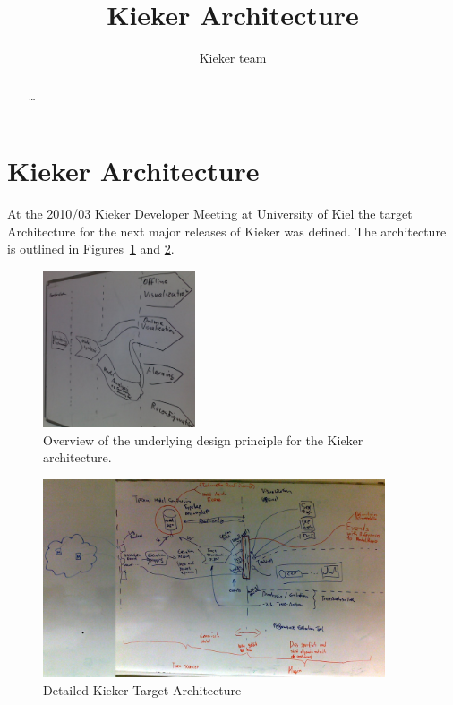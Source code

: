 \documentclass[12pt,journal,a4paper,twocolumn,final,oneside]{IEEEtran}%
\begin{document}
%

\setcounter{page}{1}

\title{%
Kieker Architecture%
}

\author{%
Kieker team
}

\maketitle

\begin{abstract}\small
\ldots
\end{abstract}

\section{Kieker Architecture}

At the 2010/03 Kieker Developer Meeting at University of Kiel the target Architecture for the next major releases of Kieker was defined. The architecture is outlined in Figures~\ref{OverviewArchitecture201003} and \ref{DetailedArchitecture201003}.

\begin{figure}
 \centering
 \includegraphics[width=0.4\textwidth]{./figures/2010-03-09-TargetArchitectureOverview.jpg}
 \caption{Overview of the underlying design principle for the Kieker architecture.}\label{OverviewArchitecture201003}
\end{figure}

\begin{figure}
 \centering
 \includegraphics[width=0.9\textwidth]{./figures/2010-03-09-TargetArchitectureDetail.jpg}
 \caption{Detailed Kieker Target Architecture}\label{DetailedArchitecture201003}
\end{figure}
\end{document}
